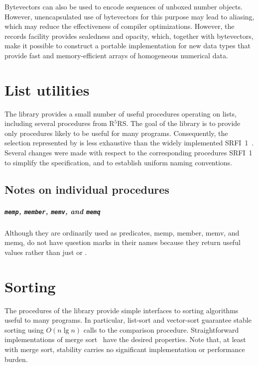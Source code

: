 \documentclass[twoside,twocolumn]{algol60}
\newcommand{\rn}[1]{R$^{#1}$RS}
\begin{document}
Bytevectors can also be used to encode sequences of unboxed number objects.
However, unencapsulated use of bytevectors for this purpose may lead
to aliasing, which may reduce the effectiveness of compiler
optimizations.  However, the records facility provides sealedness and
opacity, which, together with bytevectors, make it possible to
construct a portable implementation for new data types that
provide fast and memory-efficient arrays of homogeneous numerical
data.

\chapter{List utilities}

The  library provides a small number of useful
procedures operating on lists, including several procedures from
\rn{5}.  The goal of the library is to provide only procedures likely
to be useful for many programs.  Consequently, the selection
represented by  is less exhaustive than the widely
implemented SRFI~1~\cite{srfi1}.  Several changes were made with
respect to the corresponding procedures SRFI~1 to simplify the
specification, and to establish uniform naming conventions.

\section{Notes on individual procedures}

\paragraph{{\tt memp}, {\tt member}, {\tt memv}, and {\tt memq}}

Although they are ordinarily used as predicates, {\cf memp}, {\cf
  member}, {\cf memv}, and {\cf memq}, do not have question marks in
their names because they return useful values rather than just
\schtrue{} or \schfalse{}.

\chapter{Sorting}

The procedures of the  library provide simple
interfaces to sorting algorithms useful to many programs.  In
particular, {\cf list-sort} and {\cf vector-sort} guarantee stable
sorting using $O(n \lg n)$ calls to the comparison procedure.
Straightforward implementations of merge sort~\cite{algorithms} have
the desired properties.  Note that, at least with merge sort,
stability carries no significant implementation or performance burden.
\end{document}
